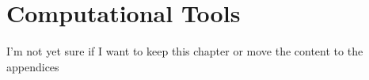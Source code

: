 \chapter{Computational Tools}

I'm not yet sure if I want to keep this chapter or move the content to the appendices
